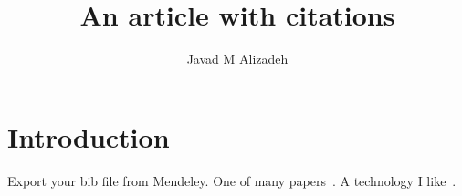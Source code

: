 \documentclass{article}
\title{An article with citations}
\author{Javad M Alizadeh}
\date{}
\begin{document}
\maketitle
	
\section{Introduction}


Export your bib file from Mendeley. One of many papers~\cite{Berman2007}. A technology I like~\cite{Lainez2012}.


	
	
\end{document}
